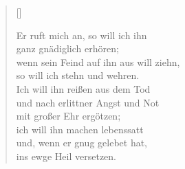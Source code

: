 \begin{center}
\settowidth{\versewidth}{Der, vor dem die Welt erschrickt,}
\begin{verse}[\versewidth]



 Er ruft mich an, so will ich ihn\\
ganz gnädiglich erhören;\\
wenn sein Feind auf ihn aus will ziehn,\\
so will ich stehn und wehren.\\
Ich will ihn reißen aus dem Tod\\
und nach erlittner Angst und Not\\
mit großer Ehr ergötzen;\\
ich will ihn machen lebenssatt\\
und, wenn er gnug gelebet hat,\\
ins ewge Heil versetzen.

  
\end{verse}
\end{center}


